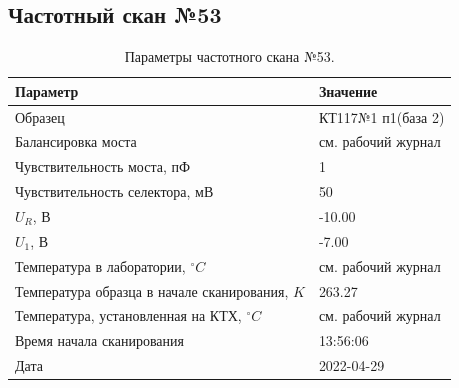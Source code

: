 \subsection{Частотный скан №53}
\begin{table}[!ht]
    \centering
    \caption{Параметры частотного скана №53.}
    \begin{tabular}{|l|l|}
        \hline
        Параметр                                       & Значение                  \\ \hline
        Образец                                        & КТ117№1 п1(база 2)        \\ \hline
        Балансировка моста                             & см. рабочий журнал        \\ \hline
        Чувствительность моста, пФ                     & 1                         \\ \hline
        Чувствительность селектора, мВ                 & 50                        \\ \hline
        $U_R$, В                                       & -10.00                    \\ \hline
        $U_1$, В                                       & -7.00                     \\ \hline
        Температура в лаборатории, $^\circ C$          & см. рабочий журнал        \\ \hline
        Температура образца в начале сканирования, $K$ & 263.27                    \\ \hline
        Температура, установленная на КТХ, $^\circ C$  & см. рабочий журнал        \\ \hline
        Время начала сканирования                      & 13:56:06                  \\ \hline
        Дата                                           & 2022-04-29                \\ \hline
    \end{tabular}
    \label{table:frequency_scan_53}
\end{table}

